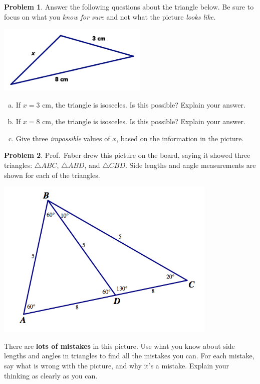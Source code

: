 \documentclass[12pt, reqno]{amsart}
\theoremstyle{remark}
\theoremstyle{definition}
\newtheorem{problem}{Problem}
\numberwithin{equation}{section}  %
\begin{document}
\begin{problem}
Answer the following questions about the triangle below.  Be sure to focus on what you \emph{know for sure} and not what the picture \emph{looks like}.

\begin{center}
\includegraphics[height=3.25cm]{triineq1}
\end{center}


\begin{enumerate}[(a)]
\item
If $x=3$ cm, the triangle is isosceles.  Is this possible? Explain your answer. \\

\item
If $x=8$ cm, the triangle is isosceles.  Is this possible? Explain your answer. \\

\item
Give three \emph{impossible} values of $x$, based on the information in the picture.\\
\end{enumerate}

\end{problem}

\bigskip


\begin{problem}
Prof.~Faber drew this picture on the board, saying it showed three triangles: $\triangle ABC$, $\triangle ABD$, and $\triangle CBD$.  Side lengths and angle measurements are shown for each of the triangles.

\begin{center}
\includegraphics[height=3in]{badtris}
\end{center}

\noindent
There are {\bf lots of mistakes} in this picture.  Use what you know about side lengths and angles in triangles to find all the mistakes you can.  For each mistake, say what is wrong with the picture, and why it's a mistake.  Explain your thinking as clearly as you can.  

\end{problem}
\end{document}
